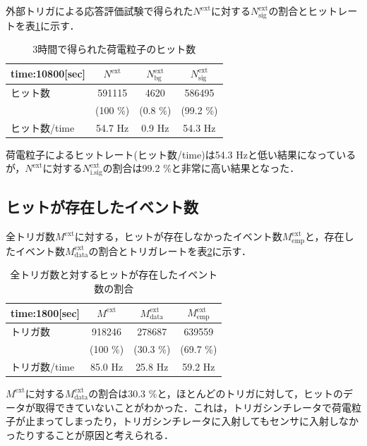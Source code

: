 外部トリガによる応答評価試験で得られた$N^{\mathrm{ext}}$に対する$N_{\mathrm{sig}}^{\mathrm{ext}}$の割合とヒットレートを表\ref{tab:extp}に示す．
\begin{table}[h]
  \centering
  \caption{3時間で得られた荷電粒子のヒット数}
  \begin{tabular} {l|ccc} \hline
    time:10800[sec]& $N^{\mathrm{ext}}$ & $N_{\mathrm{bg}}^{\mathrm{ext}}$ & $N_{\mathrm{sig}}^{\mathrm{ext}}$ \\ \hline \hline
    ヒット数 & 591115 & 4620 & 586495 \\
    & (100 \%) & (0.8 \%) & (99.2 \%) \\ \hline
    ヒット数/time & 54.7 $\mathrm{Hz}$ & 0.9 $\mathrm{Hz}$ & 54.3 $\mathrm{Hz}$ \\ \hline
  \end{tabular}
  \label{tab:extp}
\end{table}

荷電粒子によるヒットレート(ヒット数/time)は54.3 $\mathrm{Hz}$と低い結果になっているが，$N^{\mathrm{ext}}$に対する$N_{\mathrm{i.sig}}^{\mathrm{ext}}$の割合は99.2 \%と非常に高い結果となった．

\subsection*{ヒットが存在したイベント数}
全トリガ数$M^{\mathrm{ext}}$に対する，ヒットが存在しなかったイベント数$M_{\mathrm{emp}}^{\mathrm{ext}}$と，存在したイベント数$M_{\mathrm{data}}^{\mathrm{ext}}$の割合とトリガレートを表\ref{tab:extr}に示す．

\begin{table}[h]
  \centering
  \caption{全トリガ数と対するヒットが存在したイベント数の割合}
  \begin{tabular} {l|ccc} \hline
    time:1800[sec] & $M^{\mathrm{ext}}$ & $M_{\mathrm{data}}^{\mathrm{ext}}$ & $M_{\mathrm{emp}}^{\mathrm{ext}}$ \\ \hline \hline
    トリガ数 & 918246 & 278687 & 639559 \\
     & (100 \%) & (30.3 \%) & (69.7 \%) \\ \hline
    トリガ数/time & 85.0 $\mathrm{Hz}$ & 25.8 $\mathrm{Hz}$ & 59.2 $\mathrm{Hz}$ \\ \hline
  \end{tabular}
  \label{tab:extr}
\end{table}

$M^{\mathrm{ext}}$に対する$M_{\mathrm{data}}^{\mathrm{ext}}$の割合は30.3 \%と，ほとんどのトリガに対して，ヒットのデータが取得できていないことがわかった．これは，トリガシンチレータで荷電粒子が止まってしまったり，トリガシンチレータに入射してもセンサに入射しなかったりすることが原因と考えられる．

